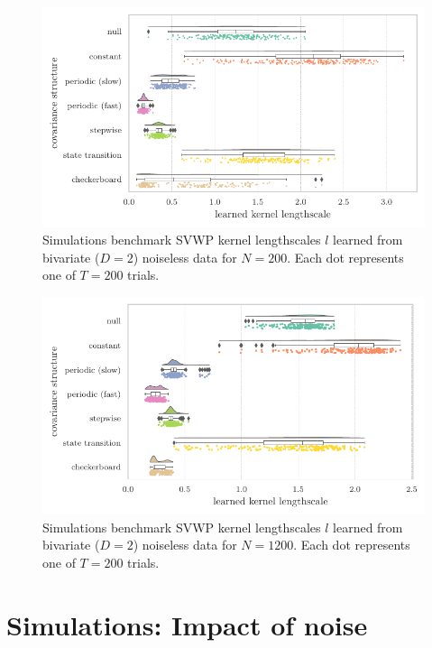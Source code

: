 \begin{figure}[ht]
    \centering
    \includegraphics[width=\textwidth]{fig/sim/d2/N0200_T0200/no_noise/SVWP_kernel_lengthscales}
    \caption{
        Simulations benchmark SVWP kernel lengthscales $l$ learned from bivariate ($D = 2$) noiseless data for $N = 200$.
        Each dot represents one of $T = 200$ trials.
    }\label{fig:sim-learned-kernel-lengthscales-N200}
\end{figure}


\begin{figure}[ht]
  \centering
  \includegraphics[width=\textwidth]{fig/sim/d2/N1200_T0200/no_noise/SVWP_kernel_lengthscales}
  \caption{
    Simulations benchmark SVWP kernel lengthscales $l$ learned from bivariate ($D = 2$) noiseless data for $N = 1200$.
    Each dot represents one of $T = 200$ trials.
  }\label{fig:sim-learned-kernel-lengthscales-N1200}
\end{figure}


\clearpage
\section{Simulations: Impact of noise}\label{ch:appendix-impact-of-noise}

